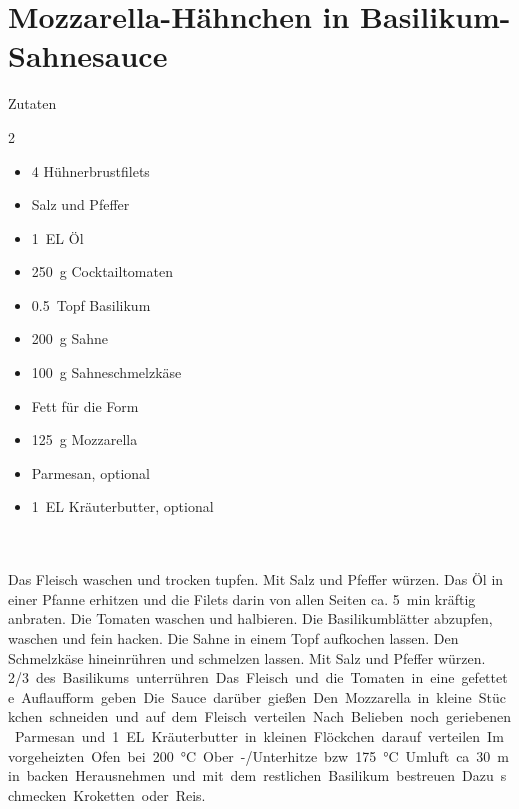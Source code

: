 \section*{Mozzarella-Hähnchen in Basilikum-Sahnesauce}
\ihead{}\ohead{}
\cfoot{}
{\Large Zutaten}
\begin{multicols}{2}
\begin{itemize}
\item \num{4} Hühnerbrustfilets
\item Salz und Pfeffer
\item \SI{1}{EL} Öl
\item \SI{250}{g} Cocktailtomaten
\item \SI{0,5}{Topf} Basilikum
\item \SI{200}{g} Sahne
\item \SI{100}{g} Sahneschmelzkäse
\item Fett für die Form
\item \SI{125}{g} Mozzarella
\item Parmesan, optional
\item \SI{1}{EL} Kräuterbutter, optional
\end{itemize}
\end{multicols}
\\
\\
Das Fleisch waschen und trocken tupfen.
Mit Salz und Pfeffer würzen.
Das Öl in einer Pfanne erhitzen und die Filets darin von allen Seiten ca. \SI{5}{min} kräftig anbraten.
Die Tomaten waschen und halbieren.
Die Basilikumblätter abzupfen, waschen und fein hacken.
Die Sahne in einem Topf aufkochen lassen.
Den Schmelzkäse hineinrühren und schmelzen lassen.
Mit Salz und Pfeffer würzen.
\SI{2/3} des Basilikums unterrühren.
Das Fleisch und die Tomaten in eine gefettete Auflaufform geben.
Die Sauce darüber gießen.
Den Mozzarella in kleine Stückchen schneiden und auf dem Fleisch verteilen.
Nach Belieben noch geriebenen Parmesan und \SI{1}{EL} Kräuterbutter in kleinen Flöckchen darauf verteilen.
Im vorgeheizten Ofen bei \SI{200}{\celsius} Ober-/Unterhitze bzw. \SI{175}{\celsius} Umluft ca. \SI{30}{min} backen.
Herausnehmen und mit dem restlichen Basilikum bestreuen.
Dazu schmecken Kroketten oder Reis.
